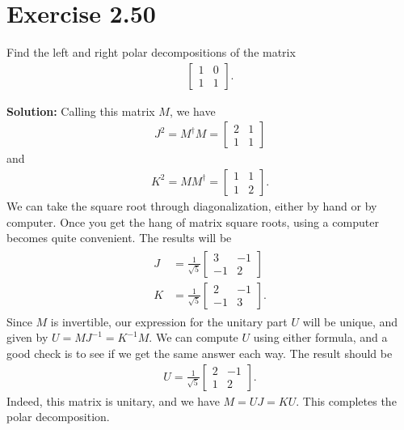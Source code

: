 \documentclass{book}
\begin{document}
\section*{Exercise 2.50}
    Find the left and right polar decompositions of the matrix
    \begin{align}
        \begin{bmatrix}
            1 & 0 \\
            1 & 1
        \end{bmatrix}.
    \end{align}
    
    \textbf{Solution:} Calling this matrix $M$, we have
    \begin{align}
        J^2 = M^\dagger M = \begin{bmatrix}
            2 & 1 \\
            1 & 1
        \end{bmatrix}
    \end{align}
    and
    \begin{align}
        K^2 = M M^\dagger = \begin{bmatrix}
            1 & 1 \\
            1 & 2
        \end{bmatrix}.
    \end{align}
    We can take the square root through diagonalization, either by hand or by computer. Once you get the hang of matrix square roots, using a computer becomes quite convenient. The results will be
    \begin{align}
    \begin{aligned}
        J &= \frac{1}{\sqrt{5}}\begin{bmatrix}
            3 & -1 \\
            -1 & 2
        \end{bmatrix} \\
        K &= \frac{1}{\sqrt{5}} \begin{bmatrix}
            2 & -1 \\
            -1 & 3
        \end{bmatrix}.
    \end{aligned}
    \end{align}
    Since $M$ is invertible, our expression for the unitary part $U$ will be unique, and given by $U = M J^{-1} = K^{-1} M$. We can compute $U$ using either formula, and a good check is to see if we get the same answer each way. The result should be
    \begin{align}
        U = \frac{1}{\sqrt{5}}\begin{bmatrix}
            2 & -1 \\
            1 & 2
        \end{bmatrix}.
    \end{align}
    Indeed, this matrix is unitary, and we have $M = UJ = KU$. This completes the polar decomposition.
    
\end{document}
